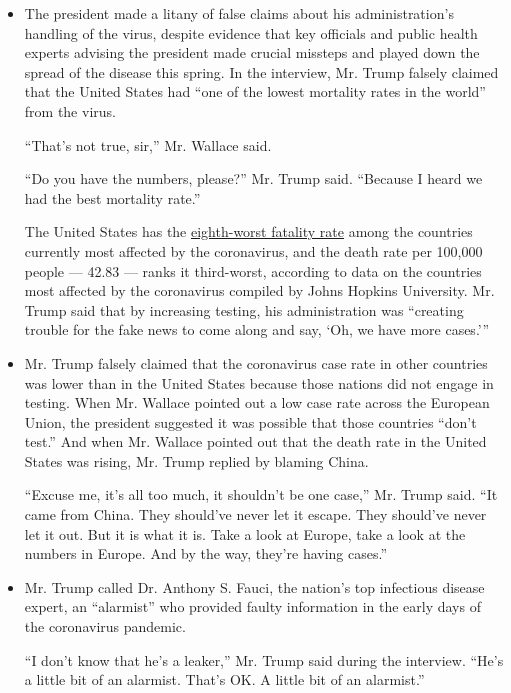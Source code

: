 \begin{itemize}
\item
  The president made a litany of false claims about his administration's
  handling of the virus, despite evidence that key officials and public
  health experts advising the president made crucial missteps and played
  down the spread of the disease this spring. In the interview, Mr.
  Trump falsely claimed that the United States had ``one of the lowest
  mortality rates in the world'' from the virus.

  ``That's not true, sir,'' Mr. Wallace said.

  ``Do you have the numbers, please?'' Mr. Trump said. ``Because I heard
  we had the best mortality rate.''

  The United States has the
  \href{https://coronavirus.jhu.edu/data/mortality}{eighth-worst
  fatality rate} among the countries currently most affected by the
  coronavirus, and the death rate per 100,000 people --- 42.83 --- ranks
  it third-worst, according to data on the countries most affected by
  the coronavirus compiled by Johns Hopkins University. Mr. Trump said
  that by increasing testing, his administration was ``creating trouble
  for the fake news to come along and say, `Oh, we have more cases.'''
\item
  Mr. Trump falsely claimed that the coronavirus case rate in other
  countries was lower than in the United States because those nations
  did not engage in testing. When Mr. Wallace pointed out a low case
  rate across the European Union, the president suggested it was
  possible that those countries ``don't test.'' And when Mr. Wallace
  pointed out that the death rate in the United States was rising, Mr.
  Trump replied by blaming China.

  ``Excuse me, it's all too much, it shouldn't be one case,'' Mr. Trump
  said. ``It came from China. They should've never let it escape. They
  should've never let it out. But it is what it is. Take a look at
  Europe, take a look at the numbers in Europe. And by the way, they're
  having cases.''
\item
  Mr. Trump called Dr. Anthony S. Fauci, the nation's top infectious
  disease expert, an ``alarmist'' who provided faulty information in the
  early days of the coronavirus pandemic.

  ``I don't know that he's a leaker,'' Mr. Trump said during the
  interview. ``He's a little bit of an alarmist. That's OK. A little bit
  of an alarmist.''


\end{itemize}
